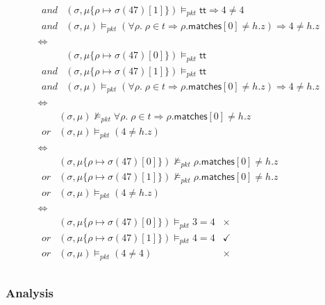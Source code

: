 \documentclass{article}
\newcommand{\pkt}{\mathit{pkt}}
\newcommand{\TRUE}{\mathsf{tt}}
\newcommand{\matches}{\mathsf{matches}}
\newcommand{\satisfy}[3]{({#1,#3}) \models_{#2}}
\newcommand{\notsatisfy}[3]{({#1,#3})\not\models_{#2}}
\begin{document}
\[\begin{array}{l}
\begin{array}{rl}
    \mathit{and}
  &\satisfy\sigma\pkt{\mu\{\rho \mapsto \sigma(47)[1]\}} \TRUE
    \Rightarrow 4 \neq 4\\
    \mathit{and}
    &\satisfy\sigma\pkt\mu (\forall \rho.\;\rho \in t \Rightarrow\rho.\matches[0] \neq h.z) \Rightarrow 4  \neq h.z
  \end{array} \\
  \iff \\
  \begin{array}{rl}
    &\satisfy\sigma\pkt{\mu\{\rho \mapsto \sigma(47)[0]\}}\TRUE \\
    \mathit{and}
  &\satisfy\sigma\pkt{\mu\{\rho \mapsto \sigma(47)[1]\}} \TRUE \\
    \mathit{and}
    &\satisfy\sigma\pkt\mu (\forall \rho.\;\rho \in t \Rightarrow\rho.\matches[0] \neq h.z) \Rightarrow 4  \neq h.z
  \end{array} \\
  \iff \\
  \begin{array}{rl}
    &\notsatisfy\sigma\pkt\mu \forall \rho.\;\rho \in t \Rightarrow\rho.\matches[0] \neq h.z \\
    \mathit{or}
    & \satisfy\sigma\pkt\mu ( 4  \neq h.z)
  \end{array}\\
  \iff\\
  \begin{array}{rl}
    &\notsatisfy\sigma\pkt{\mu\{\rho\mapsto\sigma(47)[0]\}} \rho.\matches[0] \neq h.z \\
    \mathit{or}
    &\notsatisfy\sigma\pkt{\mu\{\rho\mapsto\sigma(47)[1]\}} \rho.\matches[0] \neq h.z \\
    \mathit{or}
    & \satisfy\sigma\pkt\mu ( 4  \neq h.z)
  \end{array}\\
  \iff \\
  \begin{array}{rll}
    &\satisfy\sigma\pkt{\mu\{\rho\mapsto\sigma(47)[0]\}} 3 = 4  & \times \\
    \mathit{or}
    &\satisfy\sigma\pkt{\mu\{\rho\mapsto\sigma(47)[1]\}} 4 = 4 & \checkmark\\
    \mathit{or}
    & \satisfy\sigma\pkt\mu (4 \neq 4) & \times
  \end{array}\\
  \end{array}
\]

\subsubsection{Analysis}
\end{document}
